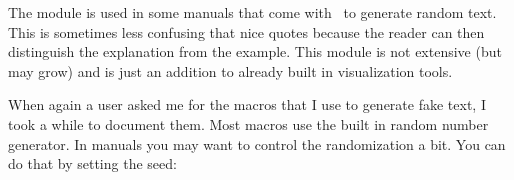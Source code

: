 
%
%


\startbuffer[abstract]
    The  module is used in some manuals that come with \CONTEXT\
    to generate random text. This is sometimes less confusing that nice quotes
    because the reader can then distinguish the explanation from the example.
    This module is not extensive (but may grow) and is just an addition to
    already built in visualization tools.
\stopbuffer

\startdocument
  [title={Faking Text and More},
   author=Hans Hagen,
   affiliation=PRAGMA ADE,
   date=August 2004,
   number=7 \MKIV]

\setupindenting[medium] \indenting[always] \setupwhitespace[none]

\subject{Remark}

When again a user asked me for the macros that I use to generate fake text, I
took a while to document them. Most macros use the built in random number
generator. In manuals you may want to control the randomization a bit. You can do
that by setting the seed:

\starttyping
\setupystem[random=12345]
\stoptyping


